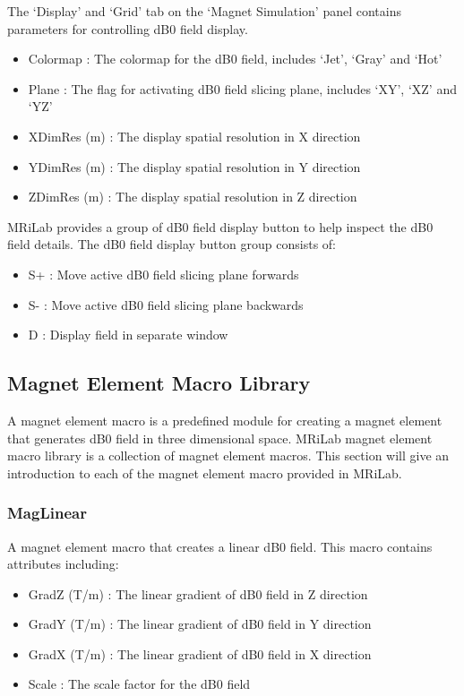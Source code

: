 \documentclass{book}%
\begin{document}
\begin{enumerate}
The `Display' and `Grid' tab on the `Magnet Simulation' panel contains parameters for controlling dB0 field display.

\begin{itemize}
	\item Colormap : The colormap for the dB0 field, includes `Jet', `Gray' and `Hot'
	\item Plane : The flag for activating dB0 field slicing plane, includes `XY', `XZ' and `YZ'
	\item XDimRes (m) : The display spatial resolution in X direction
	\item YDimRes (m) : The display spatial resolution in Y direction
	\item ZDimRes (m) : The display spatial resolution in Z direction
\end{itemize}	

\end{enumerate}

MRiLab provides a group of dB0 field display button to help inspect the dB0 field details. The dB0 field display button group consists of:

\begin{itemize}
	\item S+ : Move active dB0 field slicing plane forwards
	\item S- : Move active dB0 field slicing plane backwards
	\item D : Display field in separate window
\end{itemize}

\subsection{Magnet Element Macro Library}

A magnet element macro is a predefined module for creating a magnet element that generates dB0 field in three dimensional space. MRiLab magnet element macro library is a collection of magnet element macros. This section will give an introduction to each of the magnet element macro provided in MRiLab.

\subsubsection{MagLinear}

A magnet element macro that creates a linear dB0 field. This macro contains attributes including:

\begin{itemize}
	\item GradZ (T/m) : The linear gradient of dB0 field in Z direction
  \item GradY (T/m) : The linear gradient of dB0 field in Y direction
	\item GradX (T/m) : The linear gradient of dB0 field in X direction
	\item Scale : The scale factor for the dB0 field
\end{itemize}
\end{document}
